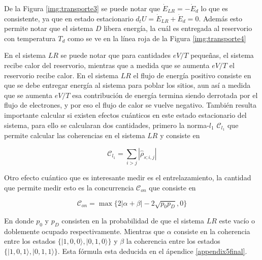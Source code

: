     
De la Figura \ref{img:transporte3} se puede notar que $\dot{E}_{LR} = -\dot{E}_{d}$ lo que es consistente, ya que en estado estacionario $d_{t}U = \dot{E}_{LR} + \dot{E}_{d} = 0$. Además esto permite notar que el sistema $D$ libera energía, la cuál es entregada al reservorio con temperatura $T_{d}$ como se ve en la línea roja de la Figura \ref{img:transporte4}

    
En el sistema $LR$ se puede notar que para cantidades $eV/T$ pequeñas, el sistema recibe calor del reservorio, mientras que a medida que se aumenta $eV/T$ el reservorio recibe calor. En el sistema $LR$ el flujo de energía positivo consiste en que se debe entregar energía al sistema para poblar los sitios, aun así a medida que se aumenta $eV/T$ esa contribución de energía termina siendo derrotada por el flujo de electrones, y por eso el flujo de calor se vuelve negativo. También resulta importante calcular si existen efectos cuánticos en este estado estacionario del sistema, para ello se calcularan dos cantidades, primero la norma-$l_{1}$ $\mathcal{C}_{l_{1}}$ que permite calcular las coherencias en el sistema $LR$ y consiste en 

\begin{equation*}
    \mathcal{C}_{l_{1}} = \sum_{i> j} |\hat{\rho}_{s;i,j}|
\end{equation*}

Otro efecto cuántico que es interesante medir es el entrelazamiento, la cantidad que permite medir esto es la concurrencia $\mathcal{C}_{on}$ \cite{hill1997entanglement,wootters1998entanglement} que consiste en 

\begin{equation*}
    \mathcal{C}_{on} = \max \{ 2|\alpha+\beta| - 2\sqrt{p_{0}p_{D}},0 \}
\end{equation*}

En donde $p_{0}$ y $p_{D}$ consisten en la probabilidad de que el sistema $LR$ este vacío o doblemente ocupado respectivamente. Mientras que $\alpha$ consiste en la coherencia entre los estados $\{|1,0,0\rangle, |0,1,0\rangle \}$ y $\beta$ la coherencia entre los estados  $\{|1,0,1\rangle, |0,1,1\rangle\}$. Esta fórmula esta deducida en el ápendice \ref{appendix5final}. 

